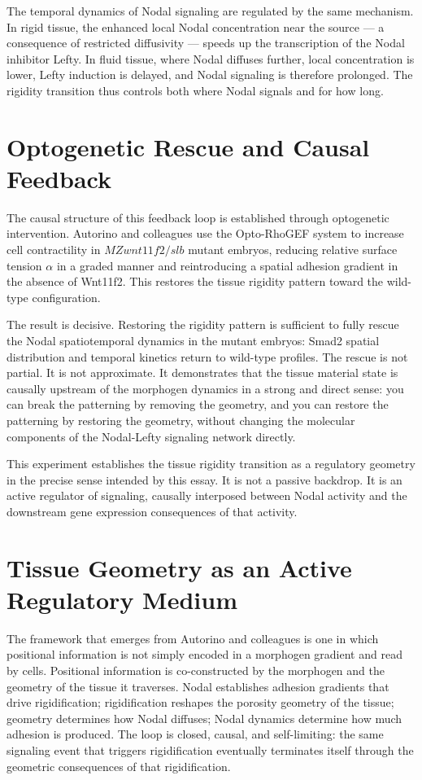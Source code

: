 \documentclass[12pt, a4paper, openany]{book}
\theoremstyle{definition}
\theoremstyle{remark}
\begin{document}
The temporal dynamics of Nodal signaling are regulated by the same mechanism. In rigid tissue, the enhanced local Nodal concentration near the source — a consequence of restricted diffusivity — speeds up the transcription of the Nodal inhibitor Lefty. In fluid tissue, where Nodal diffuses further, local concentration is lower, Lefty induction is delayed, and Nodal signaling is therefore prolonged. The rigidity transition thus controls both where Nodal signals and for how long.

\section{Optogenetic Rescue and Causal Feedback}

The causal structure of this feedback loop is established through optogenetic intervention. Autorino and colleagues use the Opto-RhoGEF system to increase cell contractility in $MZwnt11f2/slb$ mutant embryos, reducing relative surface tension $\alpha$ in a graded manner and reintroducing a spatial adhesion gradient in the absence of Wnt11f2. This restores the tissue rigidity pattern toward the wild-type configuration.

The result is decisive. Restoring the rigidity pattern is sufficient to fully rescue the Nodal spatiotemporal dynamics in the mutant embryos: Smad2 spatial distribution and temporal kinetics return to wild-type profiles. The rescue is not partial. It is not approximate. It demonstrates that the tissue material state is causally upstream of the morphogen dynamics in a strong and direct sense: you can break the patterning by removing the geometry, and you can restore the patterning by restoring the geometry, without changing the molecular components of the Nodal-Lefty signaling network directly.

This experiment establishes the tissue rigidity transition as a regulatory geometry in the precise sense intended by this essay. It is not a passive backdrop. It is an active regulator of signaling, causally interposed between Nodal activity and the downstream gene expression consequences of that activity.

\section{Tissue Geometry as an Active Regulatory Medium}

The framework that emerges from Autorino and colleagues is one in which positional information is not simply encoded in a morphogen gradient and read by cells. Positional information is co-constructed by the morphogen and the geometry of the tissue it traverses. Nodal establishes adhesion gradients that drive rigidification; rigidification reshapes the porosity geometry of the tissue; geometry determines how Nodal diffuses; Nodal dynamics determine how much adhesion is produced. The loop is closed, causal, and self-limiting: the same signaling event that triggers rigidification eventually terminates itself through the geometric consequences of that rigidification.
\end{document}
